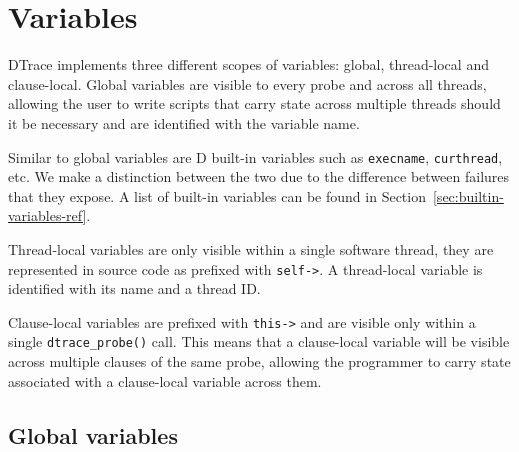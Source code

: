 



\section{Variables}
\label{sec:d-variables}
DTrace implements three different scopes of variables: global, thread-local and
clause-local. Global variables are visible to every probe and across all
threads, allowing the user to write scripts that carry state across multiple
threads should it be necessary and are identified with the variable name.

Similar to global variables are D built-in variables such as \verb|execname|,
\verb|curthread|, etc. We make a distinction between the two due to the
difference between failures that they expose. A list of built-in variables can
be found in Section~\ref{sec:builtin-variables-ref}.

Thread-local variables are only visible within a single software thread, they
are represented in source code as prefixed with \texttt{self->}.  A thread-local
variable is identified with its name and a thread ID.

Clause-local variables are prefixed with \texttt{this->} and are visible only
within a single \texttt{dtrace\_probe()} call. This means that a clause-local
variable will be visible across multiple clauses of the same probe, allowing the
programmer to carry state associated with a clause-local variable across them.

\subsection{Global variables}
\label{subsec:global-variables}

